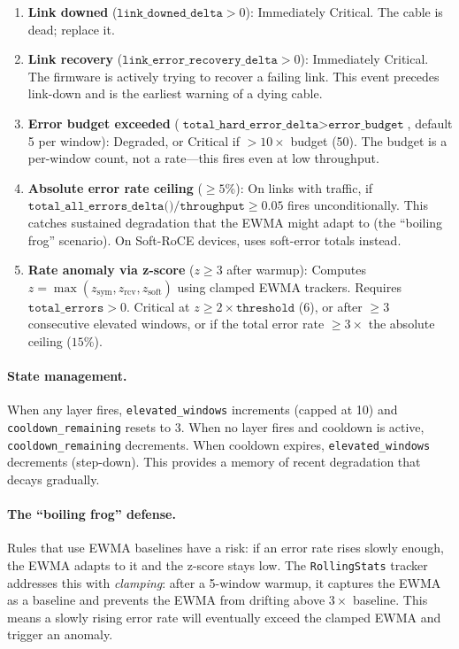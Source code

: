 \documentclass[11pt]{article}
\begin{document}
\begin{enumerate}
  \item \textbf{Link downed} ($\texttt{link\_downed\_delta} > 0$):
        Immediately Critical. The cable is dead; replace it.
  \item \textbf{Link recovery} ($\texttt{link\_error\_recovery\_delta} > 0$):
        Immediately Critical. The firmware is actively trying to recover a
        failing link. This event precedes link-down and is the earliest
        warning of a dying cable.
  \item \textbf{Error budget exceeded}
        ($\texttt{total\_hard\_error\_delta} > \texttt{error\_budget}$,
        default 5 per window):
        Degraded, or Critical if $> 10\times$ budget (50). The budget is a
        per-window count, not a rate---this fires even at low throughput.
  \item \textbf{Absolute error rate ceiling} ($\geq 5$\%):
        On links with traffic, if
        $\texttt{total\_all\_errors\_delta()} / \texttt{throughput} \geq 0.05$
        fires unconditionally. This catches sustained degradation that the
        EWMA might adapt to (the ``boiling frog'' scenario). On Soft-RoCE
        devices, uses soft-error totals instead.
  \item \textbf{Rate anomaly via z-score} ($z \geq 3$ after warmup):
        Computes $z = \max(z_\text{sym}, z_\text{rcv}, z_\text{soft})$
        using clamped EWMA trackers. Requires $\texttt{total\_errors} > 0$.
        Critical at $z \geq 2\times\texttt{threshold}$ (6), or after
        $\geq 3$ consecutive elevated windows, or if the total error rate
        $\geq 3\times$ the absolute ceiling ($15$\%).
\end{enumerate}

\paragraph{State management.}
When any layer fires, \texttt{elevated\_windows} increments (capped at 10)
and \texttt{cooldown\_remaining} resets to 3. When no layer fires and
cooldown is active, \texttt{cooldown\_remaining} decrements. When cooldown
expires, \texttt{elevated\_windows} decrements (step-down). This provides
a memory of recent degradation that decays gradually.

\paragraph{The ``boiling frog'' defense.}
Rules that use EWMA baselines have a risk: if an error rate rises slowly
enough, the EWMA adapts to it and the z-score stays low. The
\texttt{RollingStats} tracker addresses this with \emph{clamping}: after
a 5-window warmup, it captures the EWMA as a baseline and prevents the
EWMA from drifting above $3\times$ baseline. This means a slowly rising
error rate will eventually exceed the clamped EWMA and trigger an anomaly.
\end{document}
